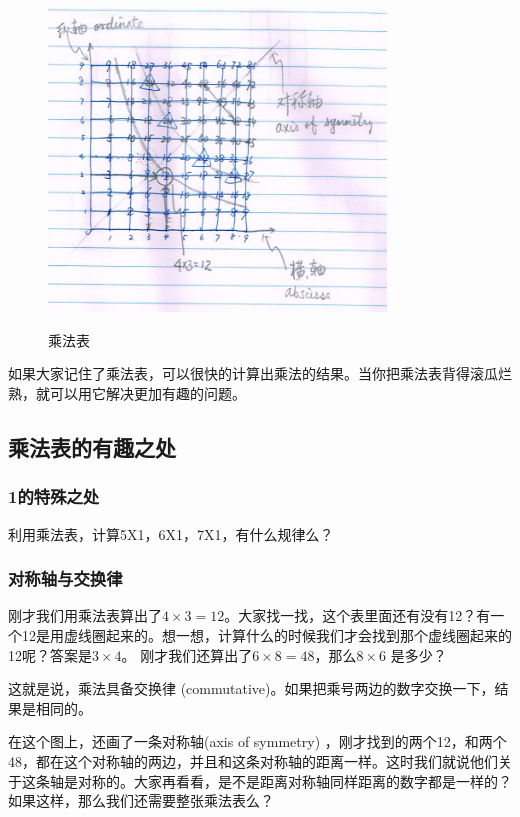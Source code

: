 \begin{figure}[h]
\center
\includegraphics[width=0.8\textwidth]{multiplication_res/multiplication_table}\label{img_multiplication_table}
\caption{乘法表}
\end{figure}

如果大家记住了乘法表，可以很快的计算出乘法的结果。当你把乘法表背得滚瓜烂熟，就可以用它解决更加有趣的问题。
\subsection{乘法表的有趣之处}
\subsubsection{1的特殊之处}
利用乘法表，计算5X1，6X1，7X1，有什么规律么？

\subsubsection{对称轴与交换律}
刚才我们用乘法表算出了$4\times3=12$。大家找一找，这个表里面还有没有12？有一个12是用虚线圈起来的。想一想，计算什么的时候我们才会找到那个虚线圈起来的12呢？答案是$3\times4$。
刚才我们还算出了$6\times8 = 48$，那么$8\times6$ 是多少？

这就是说，乘法具备交换律 (commutative)。如果把乘号两边的数字交换一下，结果是相同的。

在这个图上，还画了一条对称轴(axis of symmetry) ，刚才找到的两个12，和两个48，都在这个对称轴的两边，并且和这条对称轴的距离一样。这时我们就说他们关于这条轴是对称的。大家再看看，是不是距离对称轴同样距离的数字都是一样的？如果这样，那么我们还需要整张乘法表么？

